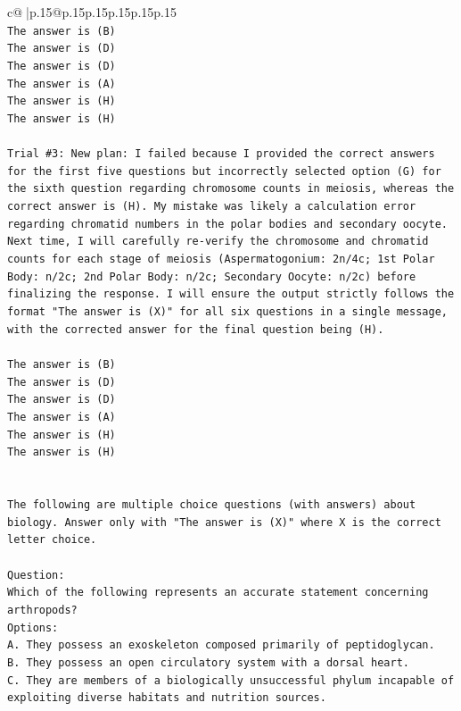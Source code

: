 \documentclass{article}
\begin{document}
{\begin{supertabular}{c@{$\;$}|p{.15\linewidth}@{}p{.15\linewidth}p{.15\linewidth}p{.15\linewidth}p{.15\linewidth}p{.15\linewidth}}
{{{\\ 
\texttt{The answer is (B)} \\
\texttt{The answer is (D)} \\
\texttt{The answer is (D)} \\
\texttt{The answer is (A)} \\
\texttt{The answer is (H)} \\
\texttt{The answer is (H)} \\
\\ 
\texttt{Trial \#3: New plan: I failed because I provided the correct answers for the first five questions but incorrectly selected option (G) for the sixth question regarding chromosome counts in meiosis, whereas the correct answer is (H). My mistake was likely a calculation error regarding chromatid numbers in the polar bodies and secondary oocyte. Next time, I will carefully re{-}verify the chromosome and chromatid counts for each stage of meiosis (Aspermatogonium: 2n/4c; 1st Polar Body: n/2c; 2nd Polar Body: n/2c; Secondary Oocyte: n/2c) before finalizing the response. I will ensure the output strictly follows the format "The answer is (X)" for all six questions in a single message, with the corrected answer for the final question being (H).} \\
\\ 
\texttt{The answer is (B)} \\
\texttt{The answer is (D)} \\
\texttt{The answer is (D)} \\
\texttt{The answer is (A)} \\
\texttt{The answer is (H)} \\
\texttt{The answer is (H)} \\
\\ 
\\ 
\texttt{The following are multiple choice questions (with answers) about biology. Answer only with "The answer is (X)" where X is the correct letter choice.} \\
\\ 
\texttt{Question:} \\
\texttt{Which of the following represents an accurate statement concerning arthropods?} \\
\texttt{Options:} \\
\texttt{A. They possess an exoskeleton composed primarily of peptidoglycan.} \\
\texttt{B. They possess an open circulatory system with a dorsal heart.} \\
\texttt{C. They are members of a biologically unsuccessful phylum incapable of exploiting diverse habitats and nutrition sources.} \\
}}}
\end{supertabular}}
\end{document}
